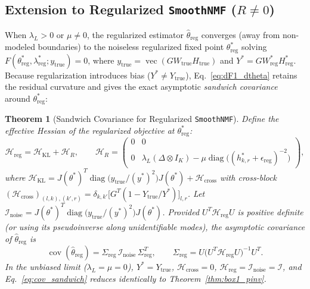 \documentclass[11pt,a4paper]{article}
\theoremstyle{plain}
\newtheorem{theorem}{Theorem}[section]
\theoremstyle{definition}
\theoremstyle{remark}
\newcommand{\cI}{\mathcal{I}}
\newcommand{\cH}{\mathcal{H}}
\newcommand{\vecop}{\operatorname{vec}}
\newcommand{\diag}{\operatorname{diag}}
\newcommand{\cov}{\operatorname{cov}}
\newcommand{\kron}{\otimes}
\begin{document}
\subsection{Extension to Regularized \texttt{SmoothNMF} (\texorpdfstring{$R \neq 0$}{R != 0})}
When $\lambda_L > 0$ or $\mu \neq 0$, the regularized estimator $\hat{\theta}_{\text{reg}}$ converges (away from non-modeled boundaries) to the noiseless regularized fixed point $\theta^*_{\text{reg}}$ solving $F(\theta^*_{\text{reg}}, \lambda^*_{\text{reg}}; y_{\text{true}}) = 0$, where $y_{\text{true}} = \vecop(G W_{\text{true}} H_{\text{true}})$ and $Y^* = G W^*_{\text{reg}} H^*_{\text{reg}}$. Because regularization introduces bias ($Y^* \neq Y_{\text{true}}$), Eq.~\eqref{eq:dF1_dtheta} retains the residual curvature and gives the exact asymptotic \emph{sandwich covariance} around $\theta^*_{\text{reg}}$:
\begin{theorem}[Sandwich Covariance for Regularized \texttt{SmoothNMF}]
\label{thm:sandwich}
Define the effective Hessian of the regularized objective at $\theta^*_{\text{reg}}$:
\begin{equation}
\label{eq:hessian_reg}
\cH_{\text{reg}} = \cH_{\text{KL}} + \cH_R, \qquad \cH_R = \begin{pmatrix} 0 & 0 \\ 0 & \lambda_L (\Delta \kron I_K) - \mu \diag\!\big((h^*_{k,r} + \epsilon_{\text{reg}})^{-2}\big) \end{pmatrix},
\end{equation}
where $\cH_{\text{KL}} = J(\theta^*)^T \diag\!\big(y_{\text{true}} / (y^*)^2\big) J(\theta^*) + \cH_{\text{cross}}$ with cross-block $(\cH_{\text{cross}})_{(l,k),(k',r)} = \delta_{k,k'} \big[G^T (1 - Y_{\text{true}} / Y^*)\big]_{l,r}$. Let $\cI_{\text{noise}} = J(\theta^*)^T \diag\!\big(y_{\text{true}} / (y^*)^2\big) J(\theta^*)$. Provided $U^T \cH_{\text{reg}} U$ is positive definite (or using its pseudoinverse along unidentifiable modes), the asymptotic covariance of $\hat{\theta}_{\text{reg}}$ is
\begin{equation}
\label{eq:cov_sandwich}
\cov(\hat{\theta}_{\text{reg}}) = \Sigma_{\text{reg}}\, \cI_{\text{noise}} \, \Sigma_{\text{reg}}^T, \qquad \Sigma_{\text{reg}} = U \big(U^T \cH_{\text{reg}} U\big)^{-1} U^T.
\end{equation}
In the unbiased limit ($\lambda_L = \mu = 0$), $Y^* = Y_{\text{true}}$, $\cH_{\text{cross}} = 0$, $\cH_{\text{reg}} = \cI_{\text{noise}} = \cI$, and Eq.~\eqref{eq:cov_sandwich} reduces identically to Theorem~\ref{thm:box1_pinv}.
\end{theorem}
\end{document}
